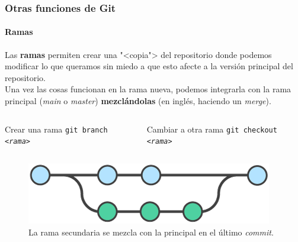 \documentclass[11pt]{beamer}
\begin{document}
\begin{frame}
    \frametitle{Otras funciones de Git}
    \framesubtitle{Ramas}

    Las \textbf{ramas} permiten crear una "<copia"> del repositorio donde podemos modificar lo que queramos sin miedo a que esto afecte a la versión principal del repositorio.\\ \smallskip
    Una vez las cosas funcionan en la rama nueva, podemos integrarla con la rama principal (\textit{main} o \textit{master}) \textbf{mezclándolas} (en inglés, haciendo un \textit{merge}).

        \begin{columns}[c]
        \begin{column}{0.45\linewidth}
            \begin{block}{Crear una rama}
                \texttt{git branch \textit{<rama>}}
            \end{block}
        \end{column}

        \begin{column}{0.45\linewidth}
            \begin{block}{Cambiar a otra rama}
                \texttt{git checkout \textit{<rama>}}
            \end{block}
        \end{column}
    \end{columns}
    
    \begin{figure}
        \includegraphics[width=0.6\linewidth]{branches.png}
        \caption{La rama secundaria se mezcla con la principal en el último \textit{commit}.}
    \end{figure}

\end{frame}
\end{document}

